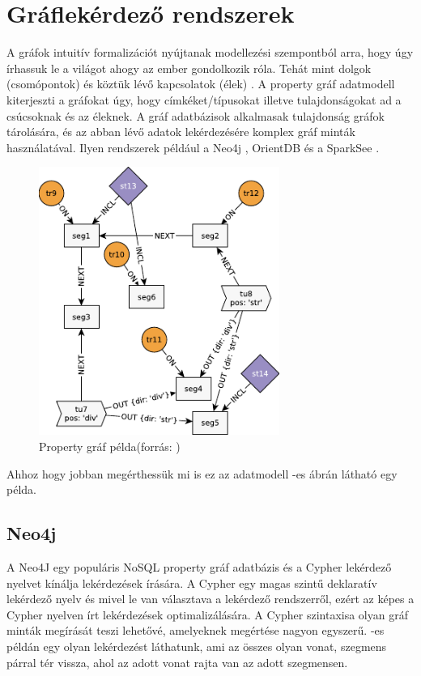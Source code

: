 \section{Gráflekérdező rendszerek}
A gráfok intuitív formalizációt nyújtanak modellezési szempontból arra, hogy úgy írhassuk le a világot ahogy az ember gondolkozik róla. Tehát mint dolgok (csomópontok) és köztük lévő kapcsolatok (élek) \cite{marton2017model}. A property gráf adatmodell kiterjeszti a gráfokat úgy, hogy címkéket/típusokat illetve tulajdonságokat ad a csúcsoknak és az éleknek. A gráf adatbázisok  alkalmasak tulajdonság gráfok tárolására, és az abban lévő adatok lekérdezésére komplex gráf minták használatával. Ilyen rendszerek például a    Neo4j \cite{neo4j}, OrientDB \cite{orientdb} és a  SparkSee \cite{sparksee}.

\begin{figure}
	\centering
	\includegraphics[width=0.7\textwidth]{figures/tulajdonsággráfpélda}
	\caption{Property gráf példa(forrás: \cite{marton2017model})}
	\label{fig:tulajdonsággráfpélda}
\end{figure}

Ahhoz hogy jobban megérthessük mi is ez az adatmodell  -es ábrán látható egy példa.
\subsection{Neo4j}

A Neo4J egy populáris NoSQL property gráf adatbázis és a Cypher lekérdező nyelvet kínálja lekérdezések írására. A Cypher egy magas szintű deklaratív lekérdező nyelv és mivel le van választava a lekérdező rendszerről, ezért az képes a Cypher nyelven írt lekérdezések optimalizálására. 
A Cypher szintaxisa olyan gráf minták megírását teszi lehetővé, amelyeknek megértése nagyon egyszerű.  -es példán egy olyan lekérdezést láthatunk,  ami az összes olyan vonat, szegmens párral tér vissza, ahol az adott vonat rajta van az adott szegmensen.  

